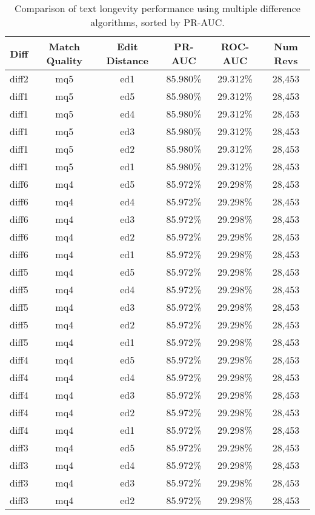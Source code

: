 \begin{table}[tbph]
\begin{center}
\begin{tabular}{|c|c|c||c|c|c|}
\hline
Diff & Match Quality & Edit Distance & PR-AUC & ROC-AUC & Num Revs \\
\hline
\hline
diff2 & mq5 & ed1 & 85.980\% & 29.312\% & 28,453 \\
diff1 & mq5 & ed5 & 85.980\% & 29.312\% & 28,453 \\
diff1 & mq5 & ed4 & 85.980\% & 29.312\% & 28,453 \\
diff1 & mq5 & ed3 & 85.980\% & 29.312\% & 28,453 \\
diff1 & mq5 & ed2 & 85.980\% & 29.312\% & 28,453 \\
diff1 & mq5 & ed1 & 85.980\% & 29.312\% & 28,453 \\
diff6 & mq4 & ed5 & 85.972\% & 29.298\% & 28,453 \\
diff6 & mq4 & ed4 & 85.972\% & 29.298\% & 28,453 \\
diff6 & mq4 & ed3 & 85.972\% & 29.298\% & 28,453 \\
diff6 & mq4 & ed2 & 85.972\% & 29.298\% & 28,453 \\
diff6 & mq4 & ed1 & 85.972\% & 29.298\% & 28,453 \\
diff5 & mq4 & ed5 & 85.972\% & 29.298\% & 28,453 \\
diff5 & mq4 & ed4 & 85.972\% & 29.298\% & 28,453 \\
diff5 & mq4 & ed3 & 85.972\% & 29.298\% & 28,453 \\
diff5 & mq4 & ed2 & 85.972\% & 29.298\% & 28,453 \\
diff5 & mq4 & ed1 & 85.972\% & 29.298\% & 28,453 \\
diff4 & mq4 & ed5 & 85.972\% & 29.298\% & 28,453 \\
diff4 & mq4 & ed4 & 85.972\% & 29.298\% & 28,453 \\
diff4 & mq4 & ed3 & 85.972\% & 29.298\% & 28,453 \\
diff4 & mq4 & ed2 & 85.972\% & 29.298\% & 28,453 \\
diff4 & mq4 & ed1 & 85.972\% & 29.298\% & 28,453 \\
diff3 & mq4 & ed5 & 85.972\% & 29.298\% & 28,453 \\
diff3 & mq4 & ed4 & 85.972\% & 29.298\% & 28,453 \\
diff3 & mq4 & ed3 & 85.972\% & 29.298\% & 28,453 \\
diff3 & mq4 & ed2 & 85.972\% & 29.298\% & 28,453 \\
\hline
\end{tabular}
\end{center}
\caption{Comparison of text longevity performance using
    multiple difference algorithms, sorted by PR-AUC.}
\label{tab:textshoutB}
\end{table}
